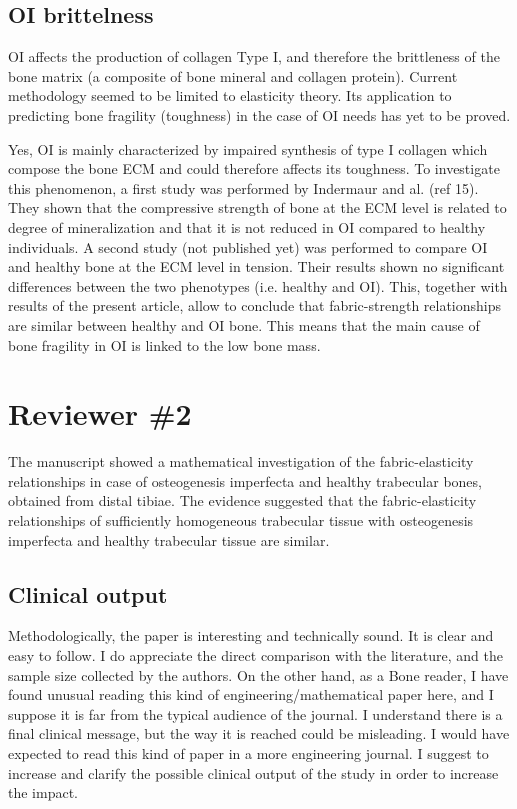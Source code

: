 \documentclass{AR2RC}
\begin{document}
\newpage
\subsection{OI brittelness}

\RC OI affects the production of collagen Type I, and therefore the brittleness of the bone matrix (a composite of bone mineral and collagen protein). Current methodology seemed to be limited to elasticity theory. Its application to predicting bone fragility (toughness) in the case of OI needs has yet to be proved.

\AR Yes, OI is mainly characterized by impaired synthesis of type I collagen which compose the bone ECM and could therefore affects its toughness. To investigate this phenomenon, a first study was performed by Indermaur and al. (ref 15). They shown that the compressive strength of bone at the ECM level is related to degree of mineralization and that it is not reduced in OI compared to healthy individuals. A second study (not published yet) was performed to compare OI and healthy bone at the ECM level in tension. Their results shown no significant differences between the two phenotypes (i.e. healthy and OI). This, together with results of the present article, allow to conclude that fabric-strength relationships are similar between healthy and OI bone. This means that the main cause of bone fragility in OI is linked to the low bone mass.


\newpage
\section{Reviewer \#2}

\RC The manuscript showed a mathematical investigation of the fabric-elasticity relationships in case of osteogenesis imperfecta and healthy trabecular bones, obtained from distal tibiae. The evidence suggested that the fabric-elasticity relationships of sufficiently homogeneous trabecular tissue with osteogenesis imperfecta and healthy trabecular tissue are similar.

\subsection{Clinical output}

\RC Methodologically, the paper is interesting and technically sound. It is clear and easy to follow. I do appreciate the direct comparison with the literature, and the sample size collected by the authors. On the other hand, as a Bone reader, I have found unusual reading this kind of engineering/mathematical paper here, and I suppose it is far from the typical audience of the journal. I understand there is a final clinical message, but the way it is reached could be misleading. I would have expected to read this kind of paper in a more engineering journal. I suggest to increase and clarify the possible clinical output of the study in order to increase the impact.
\end{document}
